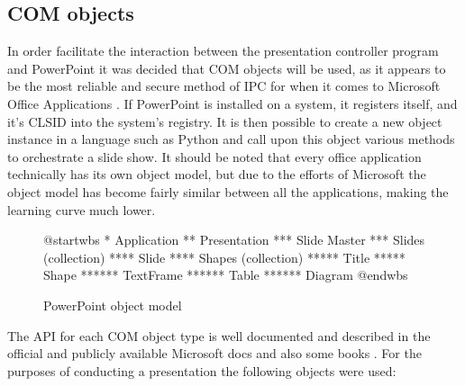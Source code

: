\documentclass[12pt, fleqn, a4paper]{article}
\begin{document}
\subsection{COM objects}
In order facilitate the interaction between the presentation controller program and PowerPoint it was decided that COM objects will be used, as it appears to be the most reliable and secure method of IPC for when it comes to Microsoft Office Applications \citep{stevewhims}. If PowerPoint is installed on a system, it registers itself, and it's CLSID into the system's registry. It is then possible to create a new object instance in a language such as Python and call upon this object various methods to orchestrate a slide show. It should be noted that every office application technically has its own object model, but due to the efforts of Microsoft the object model has become fairly similar between all the applications, making the learning curve much lower.\par
\begin{figure}[H]
	\centering
	\begin{plantuml}
@startwbs
* Application
** Presentation
*** Slide Master
*** Slides (collection)
**** Slide
**** Shapes (collection)
***** Title
***** Shape
****** TextFrame
****** Table
****** Diagram
@endwbs
	\end{plantuml}
	\caption{PowerPoint object model \citep{ppmodel}}
\end{figure}
The API for each COM object type is well documented and described in the official and publicly available Microsoft docs and also some books \citep{box1998essential}. For the purposes of conducting a presentation the following objects were used:
\end{document}
